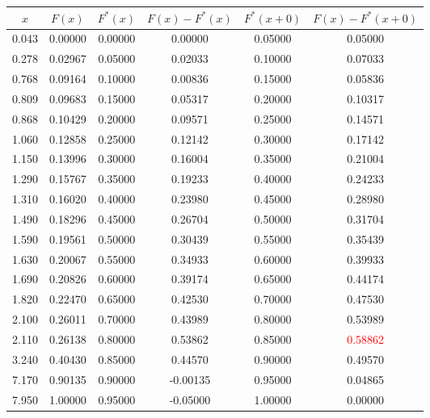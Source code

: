 \documentclass[a4paper,12pt]{article}
\begin{document}
\begin{enumerate}
              \begin{tabular}{|c|c|c|c|c|c|}
                  \hline
                  $x$   & $F(x)$  & $F^*(x)$ & $F(x) - F^*(x)$ & $F^*(x+0)$ & $F(x) - F^*(x+0)$        \\
                  \hline
                  0.043 & 0.00000 & 0.00000  & 0.00000         & 0.05000    & 0.05000                  \\
                  0.278 & 0.02967 & 0.05000  & 0.02033         & 0.10000    & 0.07033                  \\
                  0.768 & 0.09164 & 0.10000  & 0.00836         & 0.15000    & 0.05836                  \\
                  0.809 & 0.09683 & 0.15000  & 0.05317         & 0.20000    & 0.10317                  \\
                  0.868 & 0.10429 & 0.20000  & 0.09571         & 0.25000    & 0.14571                  \\
                  1.060 & 0.12858 & 0.25000  & 0.12142         & 0.30000    & 0.17142                  \\
                  1.150 & 0.13996 & 0.30000  & 0.16004         & 0.35000    & 0.21004                  \\
                  1.290 & 0.15767 & 0.35000  & 0.19233         & 0.40000    & 0.24233                  \\
                  1.310 & 0.16020 & 0.40000  & 0.23980         & 0.45000    & 0.28980                  \\
                  1.490 & 0.18296 & 0.45000  & 0.26704         & 0.50000    & 0.31704                  \\
                  1.590 & 0.19561 & 0.50000  & 0.30439         & 0.55000    & 0.35439                  \\
                  1.630 & 0.20067 & 0.55000  & 0.34933         & 0.60000    & 0.39933                  \\
                  1.690 & 0.20826 & 0.60000  & 0.39174         & 0.65000    & 0.44174                  \\
                  1.820 & 0.22470 & 0.65000  & 0.42530         & 0.70000    & 0.47530                  \\
                  2.100 & 0.26011 & 0.70000  & 0.43989         & 0.80000    & 0.53989                  \\
                  2.110 & 0.26138 & 0.80000  & 0.53862         & 0.85000    & \textcolor{red}{0.58862} \\
                  3.240 & 0.40430 & 0.85000  & 0.44570         & 0.90000    & 0.49570                  \\
                  7.170 & 0.90135 & 0.90000  & -0.00135        & 0.95000    & 0.04865                  \\
                  7.950 & 1.00000 & 0.95000  & -0.05000        & 1.00000    & 0.00000                  \\
                  \hline
              \end{tabular}


\end{enumerate}
\end{document}
